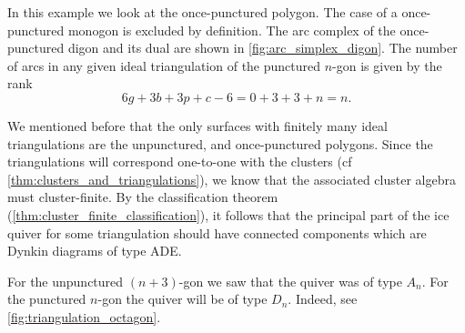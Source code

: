 \begin{example}\label{exmp:punctured_polygon1}

	In this example we look at the once-punctured polygon. The case of a once-punctured
	monogon is excluded by definition. The arc complex of the once-punctured digon and its
	dual are shown in \cref{fig:arc_simplex_digon}. The number of arcs in any given ideal
	triangulation of the punctured $n$-gon is given by the rank
	\begin{equation*}
		6g + 3b + 3p + c -6 = 0 + 3 + 3 + n = n.
	\end{equation*}

	We mentioned before that the only surfaces with finitely many ideal triangulations are
	the unpunctured, and once-punctured polygons. Since the triangulations will correspond
	one-to-one with the clusters (cf \cref{thm:clusters_and_triangulations}), we know that
	the associated cluster algebra must cluster-finite. By the classification theorem
	(\cref{thm:cluster_finite_classification}), it follows that the principal part of the
	ice quiver for some triangulation should have connected components which are Dynkin
	diagrams of type ADE.

	For the unpunctured $(n+3)$-gon we saw that the quiver was of type $A_n$. For the
	punctured $n$-gon the quiver will be of type $D_n$. Indeed, see
	\cref{fig:triangulation_octagon}.

	\begin{figure}[ht!]
		\centering

\end{figure}
\end{example}
